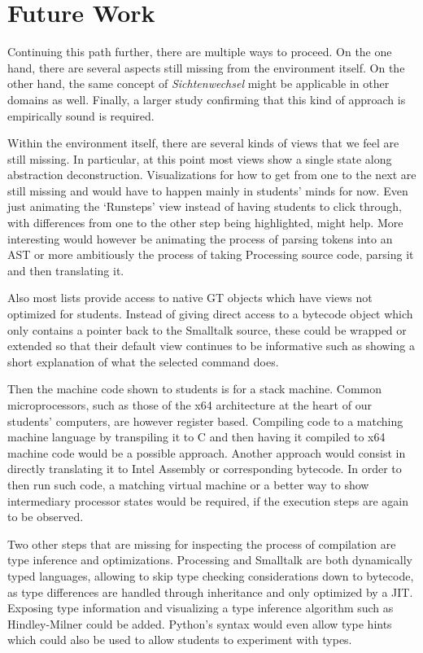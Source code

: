 \section{Future Work} \label{sc_future}

Continuing this path further, there are multiple ways to proceed. On the one hand, there are several aspects still missing from the environment itself. On the other hand, the same concept of \emph{Sichtenwechsel} might be applicable in other domains as well. Finally, a larger study confirming that this kind of approach is empirically sound is required.

Within the environment itself, there are several kinds of views that we feel are still missing. In particular, at this point most views show a single state along abstraction deconstruction. Visualizations for how to get from one to the next are still missing and would have to happen mainly in students' minds for now. Even just animating the `Runsteps' view instead of having students to click through, with differences from one to the other step being highlighted, might help. More interesting would however be animating the process of parsing tokens into an \ac{AST} or more ambitiously the process of taking Processing source code, parsing it and then translating it.

Also most lists provide access to native \ac{GT} objects which have views not optimized for students. Instead of \eg giving direct access to a bytecode object which only contains a pointer back to the Smalltalk source, these could be wrapped or extended so that their default view continues to be informative such as showing a short explanation of what the selected command does.

Then the machine code shown to students is for a stack machine. Common microprocessors, such as those of the x64 architecture at the heart of our students' computers, are however register based. Compiling code to a matching machine language by \eg transpiling it to C and then having it compiled to x64 machine code would be a possible approach. Another approach would consist in directly translating it to Intel Assembly or corresponding bytecode. In order to then run such code, a matching virtual machine or a better way to show intermediary processor states would be required, if the execution steps are again to be observed.

Two other steps that are missing for inspecting the process of compilation are type inference and optimizations. Processing and Smalltalk are both dynamically typed languages, allowing to skip type checking considerations down to bytecode, as type differences are handled through inheritance and only optimized by a \ac{JIT}. Exposing type information and visualizing a type inference algorithm such as Hindley-Milner could be added. Python's syntax would even allow type hints which could also be used to allow students to experiment with types.

